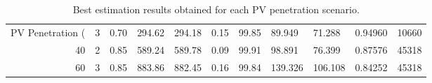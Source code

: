 \begin{table}
\caption{Best estimation results obtained for each PV penetration scenario.}
\label{tab:best_results}
\begin{tabular}{rrllllllllr}
\toprule
PV Penetration (%
\midrule
20 & 3 & 0.70 & 294.62 & 294.18 & 0.15 & 99.85 & 89.949 & 71.288 & 0.94960 & 10660 \\
40 & 2 & 0.85 & 589.24 & 589.78 & 0.09 & 99.91 & 98.891 & 76.399 & 0.87576 & 45318 \\
60 & 3 & 0.85 & 883.86 & 882.45 & 0.16 & 99.84 & 139.326 & 106.108 & 0.84252 & 45318 \\
\bottomrule
\end{tabular}
\end{table}
